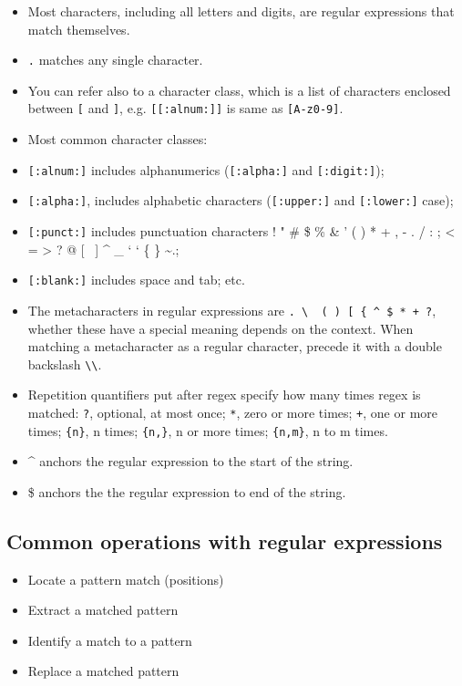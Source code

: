 \documentclass[]{book}
\providecommand{\tightlist}{%
  \setlength{\itemsep}{0pt}\setlength{\parskip}{0pt}}
\begin{document}
\begin{itemize}
\tightlist
\item
  Most characters, including all letters and digits, are regular
  expressions that match themselves.
\item
  \texttt{.} matches any single character.
\item
  You can refer also to a character class, which is a list of characters
  enclosed between \texttt{{[}} and \texttt{{]}}, e.g.
  \texttt{{[}{[}:alnum:{]}{]}} is same as \texttt{{[}A-z0-9{]}}.
\item
  Most common character classes:
\item
  \texttt{{[}:alnum:{]}} includes alphanumerics (\texttt{{[}:alpha:{]}}
  and \texttt{{[}:digit:{]}});
\item
  \texttt{{[}:alpha:{]}}, includes alphabetic characters
  (\texttt{{[}:upper:{]}} and \texttt{{[}:lower:{]}} case);
\item
  \texttt{{[}:punct:{]}} includes punctuation characters ! " \# \$ \% \&
  ' ( ) * + , - . / : ; \textless{} = \textgreater{} ? @ {[} ~{]} \^{}
  \_ ` ` \{ \textbar{} \} \textasciitilde{}.;
\item
  \texttt{{[}:blank:{]}} includes space and tab; etc.
\item
  The metacharacters in regular expressions are
  \texttt{.\ \textbackslash{}\ \textbar{}\ (\ )\ {[}\ \{\ \^{}\ \$\ *\ +\ ?},
  whether these have a special meaning depends on the context. When
  matching a metacharacter as a regular character, precede it with a
  double backslash \texttt{\textbackslash{}\textbackslash{}}.
\item
  Repetition quantifiers put after regex specify how many times regex is
  matched: \texttt{?}, optional, at most once; \texttt{*}, zero or more
  times; \texttt{+}, one or more times; \texttt{\{n\}}, n times;
  \texttt{\{n,\}}, n or more times; \texttt{\{n,m\}}, n to m times.
\item
  \^{} anchors the regular expression to the start of the string.
\item
  \$ anchors the the regular expression to end of the string.
\end{itemize}

\subsection{Common operations with regular
expressions}\label{common-operations-with-regular-expressions}

\begin{itemize}
\tightlist
\item
  Locate a pattern match (positions)
\item
  Extract a matched pattern
\item
  Identify a match to a pattern
\item
  Replace a matched pattern
\end{itemize}
\end{document}
